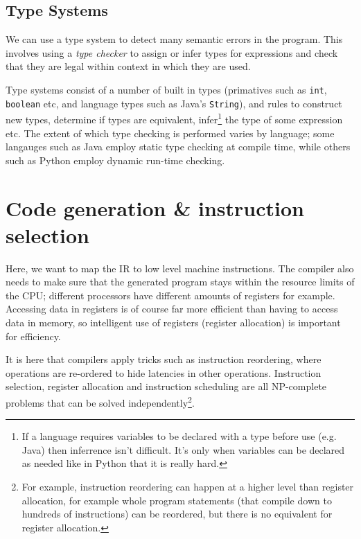 \subsection{Type Systems}

We can use a type system to detect many semantic errors in the
program. This involves using a \textit{type checker} to assign or
infer types for expressions and check that they are legal within
context in which they are used.

Type systems consist of a number of built in types (primatives such
as \texttt{int}, \texttt{boolean} etc, and language types such as
Java's \texttt{String}), and rules to construct new types, determine
if types are equivalent, infer\footnote{If a language requires
variables to be declared with a type before use (e.g. Java) then
inferrence isn't difficult. It's only when variables can be declared
as needed like in Python that it is really hard.} the type of some
expression etc. The extent of which type checking is performed varies
by language; some langauges such as Java employ static type checking
at compile time, while others such as Python employ dynamic run-time
checking.







\section{Code generation \& instruction selection}

Here, we want to map the IR to low level machine instructions. The
compiler also needs to make sure that the generated program stays
within the resource limits of the CPU; different processors have
different amounts of registers for example. Accessing data in
registers is of course far more efficient than having to access data
in memory, so intelligent use of registers (register allocation) is
important for efficiency.

It is here that compilers apply tricks such as instruction reordering,
where operations are re-ordered to hide latencies in other
operations. Instruction selection, register allocation and instruction
scheduling are all NP-complete problems that can be solved
independently\footnote{For example, instruction reordering can happen
at a higher level than register allocation, for example whole program
statements (that compile down to hundreds of instructions) can be
reordered, but there is no equivalent for register allocation.}.

